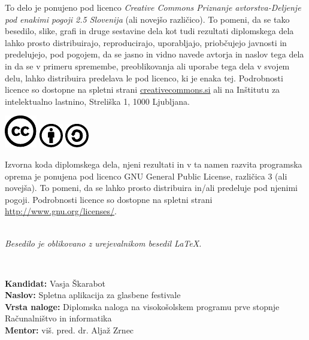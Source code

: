 \documentclass[a4paper,12pt,openright]{book}
\newcommand{\clearemptydoublepage}{\newpage{\pagestyle{empty}\cleardoublepage}}
\newcommand{\CcImageCc}[1]{%
	\includegraphics[scale=#1]{cc_cc_30.pdf}%
}
\newcommand{\CcImageBy}[1]{%
	\includegraphics[scale=#1]{cc_by_30.pdf}%
}
\newcommand{\CcImageSa}[1]{%
	\includegraphics[scale=#1]{cc_sa_30.pdf}%
}
\begin{document}
\newpage
\thispagestyle{empty}

\vspace*{5cm}
{\small \noindent
To delo je ponujeno pod licenco \textit{Creative Commons Priznanje avtorstva-Deljenje pod enakimi pogoji 2.5 Slovenija} (ali novej\v so razli\v cico).
To pomeni, da se tako besedilo, slike, grafi in druge sestavine dela kot tudi rezultati diplomskega dela lahko prosto distribuirajo,
reproducirajo, uporabljajo, priobčujejo javnosti in predelujejo, pod pogojem, da se jasno in vidno navede avtorja in naslov tega
dela in da se v primeru spremembe, preoblikovanja ali uporabe tega dela v svojem delu, lahko distribuira predelava le pod
licenco, ki je enaka tej.
Podrobnosti licence so dostopne na spletni strani \href{http://creativecommons.si}{creativecommons.si} ali na Inštitutu za
intelektualno lastnino, Streliška 1, 1000 Ljubljana.

\vspace*{1cm}
\begin{center}%
\CcImageCc{0.741573033707865}\hspace*{1ex}\CcImageBy{1}\hspace*{1ex}\CcImageSa{1}%
\end{center}
}

\vspace*{1cm}
{\small \noindent
Izvorna koda diplomskega dela, njeni rezultati in v ta namen razvita programska oprema je ponujena pod licenco GNU General Public License,
različica 3 (ali novejša). To pomeni, da se lahko prosto distribuira in/ali predeluje pod njenimi pogoji.
Podrobnosti licence so dostopne na spletni strani \url{http://www.gnu.org/licenses/}.
}

\vfill
\begin{center} 
\ \\ \vfill
{\em
Besedilo je oblikovano z urejevalnikom besedil \LaTeX.}
\end{center}

\clearemptydoublepage

\thispagestyle{empty}
\
\vfill

\bigskip
\noindent\textbf{Kandidat:} Vasja Škarabot\\
\noindent\textbf{Naslov:} Spletna aplikacija za glasbene festivale\\
\noindent\textbf{Vrsta naloge:} Diplomska naloga na visokošolskem programu prve stopnje Računalništvo in informatika \\
\noindent\textbf{Mentor:} viš. pred. dr. Aljaž Zrnec\\
\end{document}
